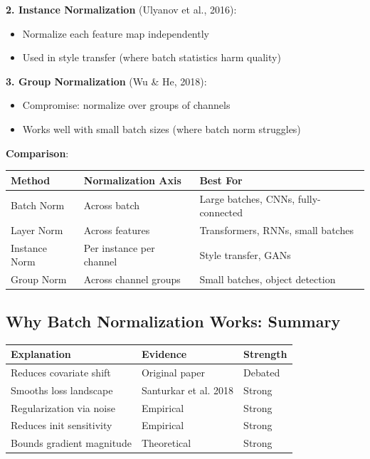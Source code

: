 \textbf{2. Instance Normalization} (Ulyanov et al., 2016):
\begin{itemize}
\item Normalize each feature map independently
\item Used in style transfer (where batch statistics harm quality)
\end{itemize}

\textbf{3. Group Normalization} (Wu \& He, 2018):
\begin{itemize}
\item Compromise: normalize over groups of channels
\item Works well with small batch sizes (where batch norm struggles)
\end{itemize}

\textbf{Comparison}:

\begin{table}[h]
\centering
\begin{tabular}{lll}
\toprule
\textbf{Method} & \textbf{Normalization Axis} & \textbf{Best For} \\
\midrule
Batch Norm & Across batch & Large batches, CNNs, fully-connected \\
Layer Norm & Across features & Transformers, RNNs, small batches \\
Instance Norm & Per instance per channel & Style transfer, GANs \\
Group Norm & Across channel groups & Small batches, object detection \\
\bottomrule
\end{tabular}
\end{table}

\subsection{Why Batch Normalization Works: Summary}

\begin{table}[h]
\centering
\begin{tabular}{lll}
\toprule
\textbf{Explanation} & \textbf{Evidence} & \textbf{Strength} \\
\midrule
Reduces covariate shift & Original paper & Debated \\
Smooths loss landscape & Santurkar et al. 2018 & Strong \\
Regularization via noise & Empirical & Strong \\
Reduces init sensitivity & Empirical & Strong \\
Bounds gradient magnitude & Theoretical & Strong \\
\bottomrule
\end{tabular}
\end{table}

